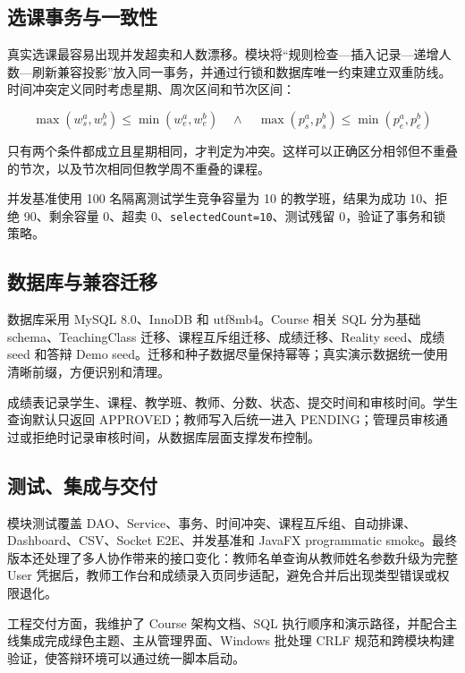 \documentclass[UTF8,11pt,a4paper]{ctexart}
\newcommand{\codeword}[1]{\texttt{\color{VCGreen}#1}}
\begin{document}
\subsection{选课事务与一致性}

真实选课最容易出现并发超卖和人数漂移。模块将“规则检查—插入记录—递增人数—刷新兼容投影”放入同一事务，并通过行锁和数据库唯一约束建立双重防线。时间冲突定义同时考虑星期、周次区间和节次区间：

\[
\max(w_s^a,w_s^b) \leq \min(w_e^a,w_e^b)
\quad\land\quad
\max(p_s^a,p_s^b) \leq \min(p_e^a,p_e^b)
\]

只有两个条件都成立且星期相同，才判定为冲突。这样可以正确区分相邻但不重叠的节次，以及节次相同但教学周不重叠的课程。

并发基准使用 100 名隔离测试学生竞争容量为 10 的教学班，结果为成功 10、拒绝 90、剩余容量 0、超卖 0、\codeword{selectedCount=10}、测试残留 0，验证了事务和锁策略。

\subsection{数据库与兼容迁移}

数据库采用 MySQL 8.0、InnoDB 和 utf8mb4。Course 相关 SQL 分为基础 schema、TeachingClass 迁移、课程互斥组迁移、成绩迁移、Reality seed、成绩 seed 和答辩 Demo seed。迁移和种子数据尽量保持幂等；真实演示数据统一使用清晰前缀，方便识别和清理。

成绩表记录学生、课程、教学班、教师、分数、状态、提交时间和审核时间。学生查询默认只返回 APPROVED；教师写入后统一进入 PENDING；管理员审核通过或拒绝时记录审核时间，从数据库层面支撑发布控制。

\subsection{测试、集成与交付}

模块测试覆盖 DAO、Service、事务、时间冲突、课程互斥组、自动排课、Dashboard、CSV、Socket E2E、并发基准和 JavaFX programmatic smoke。最终版本还处理了多人协作带来的接口变化：教师名单查询从教师姓名参数升级为完整 User 凭据后，教师工作台和成绩录入页同步适配，避免合并后出现类型错误或权限退化。

工程交付方面，我维护了 Course 架构文档、SQL 执行顺序和演示路径，并配合主线集成完成绿色主题、主从管理界面、Windows 批处理 CRLF 规范和跨模块构建验证，使答辩环境可以通过统一脚本启动。
\end{document}
